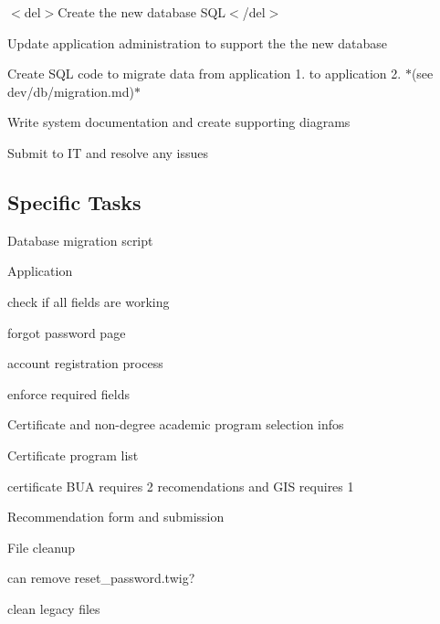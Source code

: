 \begin{DoxyItemize}
\item $<$del$>$Create the new database S\-Q\-L$<$/del$>$
\item Update application administration to support the the new database
\item Create S\-Q\-L code to migrate data from application 1. to application 2. $\ast$(see dev/db/migration.\-md)$\ast$
\item Write system documentation and create supporting diagrams
\item Submit to I\-T and resolve any issues
\end{DoxyItemize}

\subsection*{Specific Tasks}


\begin{DoxyItemize}
\item Database migration script
\end{DoxyItemize}


\begin{DoxyItemize}
\item Application
\begin{DoxyItemize}
\item check if all fields are working
\item forgot password page
\item account registration process
\item enforce required fields
\item Certificate and non-\/degree academic program selection infos
\item Certificate program list
\item certificate B\-U\-A requires 2 recomendations and G\-I\-S requires 1
\end{DoxyItemize}
\end{DoxyItemize}


\begin{DoxyItemize}
\item Recommendation form and submission
\end{DoxyItemize}


\begin{DoxyItemize}
\item File cleanup
\begin{DoxyItemize}
\item can remove reset\-\_\-password.\-twig?
\item clean legacy files
\end{DoxyItemize}
\end{DoxyItemize}


